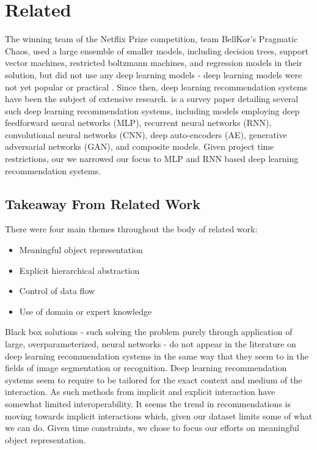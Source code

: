 \section{Related}
The winning team of the Netflix Prize competition, team BellKor's Pragmatic Chaos, used a large ensemble of smaller models, including decision trees, support vector machines, restricted boltzmann machines, and regression models in their solution, but did not use any deep learning models - deep learning models were not yet popular or practical \cite{Piotte 09th Pragmatic}\cite{bigChaos}\cite{Koren091the}. Since then, deep learning recommendation systems have been the subject of extensive research. \cite{DBLP:journals/corr/ZhangYS17aa} is a survey paper detailing several such deep learning recommendation systems, including models employing deep feedforward neural networks (MLP), recurrent neural networks (RNN), convolutional neural networks (CNN), deep auto-encoders (AE), generative adversarial networks (GAN), and composite models. Given project time restrictions, our we narrowed our focus to MLP and RNN based deep learning recommendation systems. 
\subsection{Takeaway From Related Work}
There were four main themes throughout the body of related work:
\begin{itemize}
\item Meaningful object representation
\item Explicit hierarchical abstraction
\item Control of data flow
\item Use of domain or expert knowledge
\end{itemize}
Black box solutions - such solving the problem purely through application of large, overparameterized, neural networks - do not appear in the literature on deep learning recommendation systems in the same way that they seem to in the fields of image segmentation or recognition. Deep learning recommendation systems seem to require to be tailored for the exact context and medium of the interaction. As such methods from implicit and explicit interaction have somewhat limited interoperability. It seems the trend in recommendations is moving towards implicit interactions which, given our dataset limits some of what we can do. Given time constraints, we chose to focus our efforts on meaningful object representation.  